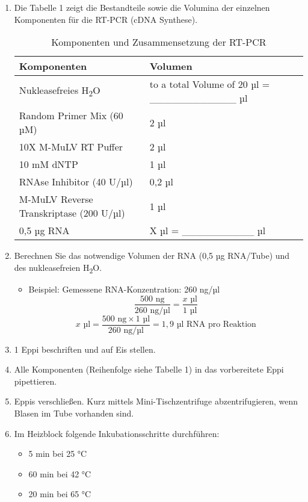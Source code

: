 \documentclass[a4paper,12pt]{article}
\begin{document}
\begin{enumerate}
    \item Die Tabelle 1 zeigt die Bestandteile sowie die Volumina der einzelnen Komponenten für die RT-PCR (cDNA Synthese).
    \begin{table}[h!]
        \centering
        \begin{tabular}{|l|l|}
            \hline
            \textbf{Komponenten} & \textbf{Volumen} \\ \hline
            Nukleasefreies H\textsubscript{2}O & to a total Volume of 20 µl = \_\_\_\_\_\_\_\_\_\_\_\_ µl \\ \hline
            Random Primer Mix (60 µM) & 2 µl \\ \hline
            10X M-MuLV RT Puffer & 2 µl \\ \hline
            10 mM dNTP & 1 µl \\ \hline
            RNAse Inhibitor (40 U/µl) & 0,2 µl \\ \hline
            M-MuLV Reverse Transkriptase (200 U/µl) & 1 µl \\ \hline
            0,5 µg RNA & X µl = \_\_\_\_\_\_\_\_\_\_ µl \\ \hline
        \end{tabular}
        \caption{Komponenten und Zusammensetzung der RT-PCR}
    \end{table}

    \item Berechnen Sie das notwendige Volumen der RNA (0,5 µg RNA/Tube) und des nukleasefreien H\textsubscript{2}O.
    \begin{itemize}
        \item Beispiel: Gemessene RNA-Konzentration: 260 ng/µl
        \[
        \frac{500 \text{ ng}}{260 \text{ ng/µl}} = \frac{x \text{ µl}}{1 \text{ µl}}
        \]
        \[
        x \text{ µl} = \frac{500 \text{ ng} \times 1 \text{ µl}}{260 \text{ ng/µl}} = 1,9 \text{ µl RNA pro Reaktion}
        \]
    \end{itemize}

    \item 1 Eppi beschriften und auf Eis stellen.
    \item Alle Komponenten (Reihenfolge siehe Tabelle 1) in das vorbereitete Eppi pipettieren.
    \item Eppis verschließen. Kurz mittels Mini-Tischzentrifuge abzentrifugieren, wenn Blasen im Tube vorhanden sind.
    \item Im Heizblock folgende Inkubationsschritte durchführen:
    \begin{itemize}
        \item 5 min bei 25 °C
        \item 60 min bei 42 °C
        \item 20 min bei 65 °C
    \end{itemize}

    
\end{enumerate}
\end{document}
